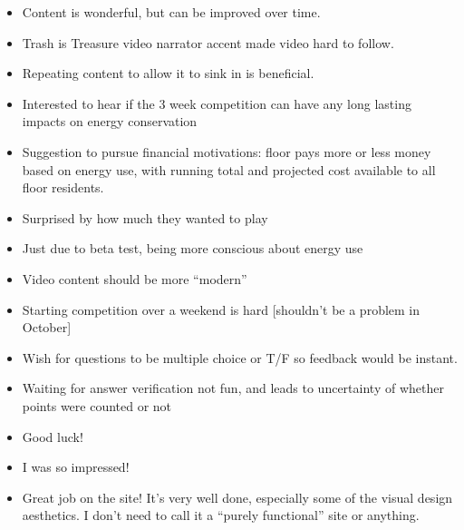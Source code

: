 \begin{itemize}
  \item Content is wonderful, but can be improved over time.
  \item Trash is Treasure video narrator accent made video hard to follow.
  \item Repeating content to allow it to sink in is beneficial.
  \item Interested to hear if the 3 week competition can have any long lasting impacts on energy conservation
  \item Suggestion to pursue financial motivations: floor pays more or less money based on energy use, with running total and projected cost available to all floor residents.
  \item Surprised by how much they wanted to play
  \item Just due to beta test, being more conscious about energy use
  \item Video content should be more ``modern''
  \item Starting competition over a weekend is hard [shouldn't be a problem in October]
  \item Wish for questions to be multiple choice or T/F so feedback would be instant.
  \item Waiting for answer verification not fun, and leads to uncertainty of whether points were counted or not
  \item Good luck!
  \item I was so impressed!
  \item Great job on the site! It's very well done, especially some of the visual design aesthetics. I don't need to call it a ``purely functional'' site or anything.
\end{itemize}